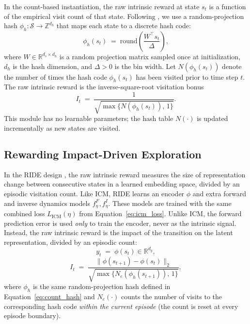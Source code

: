 In the count-based instantiation, the raw intrinsic reward at state $s_t$ is a function of the empirical visit count of that state. Following \cite{tang2017exploration}, we use a random-projection hash $\phi_h : \mathcal{S} \to \mathbb{Z}^{d_h}$ that maps each state to a discrete hash code:
\begin{equation}
\phi_h(s_t) \;=\; \mathrm{round}\!\left( \frac{W^\top s_t}{\Delta} \right),
\label{eq:count_hash}
\end{equation}
where $W \in \mathbb{R}^{d_s \times d_h}$ is a random projection matrix sampled once at initialization, $d_h$ is the hash dimension, and $\Delta > 0$ is the bin width. Let $N(\phi_h(s_t))$ denote the number of times the hash code $\phi_h(s_t)$ has been visited prior to time step $t$. The raw intrinsic reward is the inverse-square-root visitation bonus
\begin{equation}
I_t \;=\; \frac{1}{\sqrt{\max\{N(\phi_h(s_t)),\, 1\}}}.
\label{eq:count_raw}
\end{equation}
This module has no learnable parameters; the hash table $N(\cdot)$ is updated incrementally as new states are visited.

\subsection{Rewarding Impact-Driven Exploration}
\label{sec:ride_module}

In the RIDE design \cite{raileanu2020ride}, the raw intrinsic reward measures the size of representation change between consecutive states in a learned embedding space, divided by an episodic visitation count. Like ICM, RIDE learns an encoder $\phi$ and extra forward and inverse dynamics models $f^F_\eta, f^I_\eta$. These models are trained with the same combined loss $L_\text{ICM}(\eta)$ from Equation~\eqref{eq:icm_loss}. Unlike ICM, the forward prediction error is used \emph{only} to train the encoder, never as the intrinsic signal. Instead, the raw intrinsic reward is the impact of the transition on the latent representation, divided by an episodic count:
\begin{equation}
y_t \;=\; \phi(s_t) \in \mathbb{R}^{d_y},
\label{eq:ride_embed}
\end{equation}
\begin{equation}
I_t \;=\; \frac{\bigl\| \phi(s_{t+1}) - \phi(s_t) \bigr\|_2}{\sqrt{\max\{ N_e(\phi_h(s_{t+1})),\, 1 \}}},
\label{eq:ride_raw}
\end{equation}
where $\phi_h$ is the same random-projection hash defined in Equation~\eqref{eq:count_hash} and $N_e(\cdot)$ counts the number of visits to the corresponding hash code \emph{within the current episode} (the count is reset at every episode boundary).

